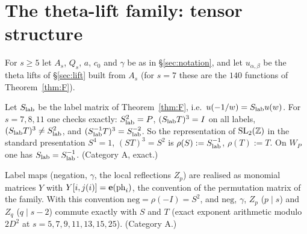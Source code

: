 \section{The theta-lift family: tensor structure}\label{sec:family}
For $s\ge5$ let $A_s$, $Q_s$, $a$, $c_0$ and $\gamma$ be as in \S\ref{sec:notation}, and let $u_{\alpha,\beta}$ be the theta lifts of \S\ref{sec:lift} built from
$A_s$ (for $s=7$ these are the $140$ functions of Theorem~\ref{thm:F}).

\begin{remark}\label{rem:Sconv}
Let $S_{\rm lab}$ be the label matrix of Theorem~\ref{thm:F}, i.e.\ $u(-1/w)=S_{\rm lab}u(w)$. For $s=7,8,11$ one checks exactly: $S_{\rm lab}^2=P$,
$(S_{\rm lab}T)^3=I$ on all labels, $(S_{\rm lab}T)^3\neq S_{\rm lab}^2$, and $(S_{\rm lab}^{-1}T)^3=S_{\rm lab}^{-2}$. So the representation of $\mathrm{SL}_2(\mathbb{Z})$ in
the standard presentation $S^4=1$, $(ST)^3=S^2$ is $\rho(S):=S_{\rm lab}^{-1}$, $\rho(T):=T$. On $W_P$ one has $S_{\rm lab}=S_{\rm lab}^{-1}$. (Category A, exact.)
\end{remark}

\begin{remark}\label{rem:conv}
Label maps (negation, $\gamma$, the local reflections $Z_p$) are realised as monomial matrices $Y$ with $Y[i,j(i)]=\mathbf{e}(\mathrm{ph}_i)$, the convention of the
permutation matrix of the family. With this convention $\mathrm{neg}=\rho(-I)=S^2$, and $\mathrm{neg}$, $\gamma$, $Z_p$ ($p\mid s$) and $Z_q$ ($q\mid s-2$) commute exactly
with $S$ and $T$ (exact exponent arithmetic modulo $2D^2$ at $s=5,7,9,11,13,15,25$). (Category A.)
\end{remark}


